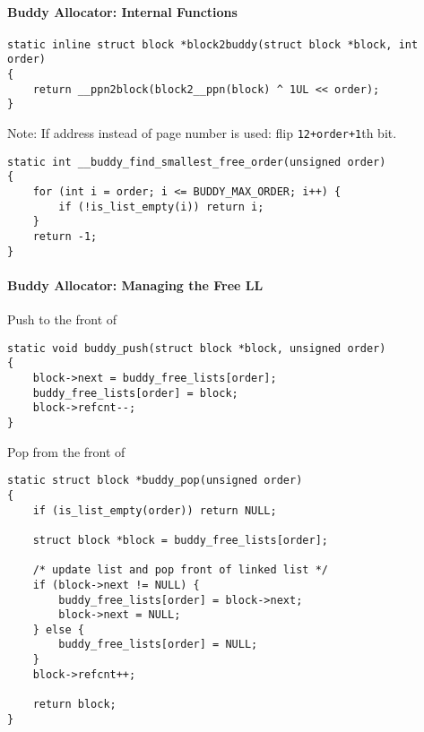 \paragraph{Buddy Allocator: Internal Functions}
\begin{lstlisting}[style=bright_C++]
static inline struct block *block2buddy(struct block *block, int order)
{
    return __ppn2block(block2__ppn(block) ^ 1UL << order);
}
\end{lstlisting}
Note: If address instead of page number is used: flip \texttt{12+order+1}th bit.

\newpar{}
\begin{lstlisting}[style=bright_C++]
static int __buddy_find_smallest_free_order(unsigned order)
{
    for (int i = order; i <= BUDDY_MAX_ORDER; i++) {
        if (!is_list_empty(i)) return i;
    }
    return -1;
}
\end{lstlisting}

\paragraph{Buddy Allocator: Managing the Free LL}

Push to the front of 
\begin{lstlisting}[style=bright_C++]
static void buddy_push(struct block *block, unsigned order)
{
	block->next = buddy_free_lists[order];
	buddy_free_lists[order] = block;
	block->refcnt--;
}
\end{lstlisting}

\newpar{}

Pop from the front of 
\begin{lstlisting}[style=bright_C++]
static struct block *buddy_pop(unsigned order)
{
    if (is_list_empty(order)) return NULL;

    struct block *block = buddy_free_lists[order];

    /* update list and pop front of linked list */
    if (block->next != NULL) {
        buddy_free_lists[order] = block->next;
        block->next = NULL;
    } else {
        buddy_free_lists[order] = NULL;
    }
    block->refcnt++;

    return block;
}
\end{lstlisting}

\newpar{}

